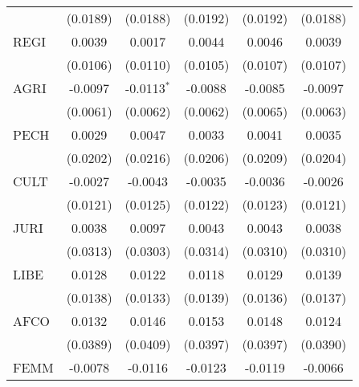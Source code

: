 \begin{tabular}{lccccc}
                                             & (0.0189)       & (0.0188)       & (0.0192)       & (0.0192)       & (0.0188)\\   
   REGI                                      & 0.0039         & 0.0017         & 0.0044         & 0.0046         & 0.0039\\   
                                             & (0.0106)       & (0.0110)       & (0.0105)       & (0.0107)       & (0.0107)\\   
   AGRI                                      & -0.0097        & -0.0113$^{*}$  & -0.0088        & -0.0085        & -0.0097\\   
                                             & (0.0061)       & (0.0062)       & (0.0062)       & (0.0065)       & (0.0063)\\   
   PECH                                      & 0.0029         & 0.0047         & 0.0033         & 0.0041         & 0.0035\\   
                                             & (0.0202)       & (0.0216)       & (0.0206)       & (0.0209)       & (0.0204)\\   
   CULT                                      & -0.0027        & -0.0043        & -0.0035        & -0.0036        & -0.0026\\   
                                             & (0.0121)       & (0.0125)       & (0.0122)       & (0.0123)       & (0.0121)\\   
   JURI                                      & 0.0038         & 0.0097         & 0.0043         & 0.0043         & 0.0038\\   
                                             & (0.0313)       & (0.0303)       & (0.0314)       & (0.0310)       & (0.0310)\\   
   LIBE                                      & 0.0128         & 0.0122         & 0.0118         & 0.0129         & 0.0139\\   
                                             & (0.0138)       & (0.0133)       & (0.0139)       & (0.0136)       & (0.0137)\\   
   AFCO                                      & 0.0132         & 0.0146         & 0.0153         & 0.0148         & 0.0124\\   
                                             & (0.0389)       & (0.0409)       & (0.0397)       & (0.0397)       & (0.0390)\\   
   FEMM                                      & -0.0078        & -0.0116        & -0.0123        & -0.0119        & -0.0066\\   

\end{tabular}
